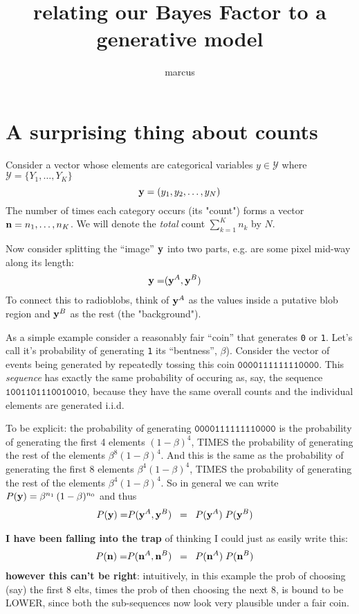 \documentclass[12pt]{article}
\title{relating our Bayes Factor to a generative model}
\author{marcus}
\date{}
\begin{document}
\maketitle

\section{A surprising thing about counts}

Consider a vector whose elements are categorical variables $y \in \mathcal{Y} $ where $\mathcal{Y} = \{Y_1,\ldots,Y_K \}$
\[
\mathbf{y} = (y_1,y_2, \ldots, y_N) \]
The number of times each category occurs (its "count") forms a vector
$ \mathbf{n} = n_1,\ldots,n_K  $. We will denote the {\it total} count $\sum_{k=1}^K n_k$ by $N$.

Now consider splitting the ``image'' $\mathbf{y}$ into two parts, e.g. are some pixel mid-way along its length:
\begin{align*}
\mathbf{y} =& (\mathbf{y}^A, \mathbf{y}^B)
\end{align*}
To connect this to radioblobs, think of $\mathbf{y}^A$ as the values inside a putative blob region and $\mathbf{y}^B$ as the rest (the "background").

As a simple example consider a reasonably fair ``coin'' that
generates \texttt{0} or \texttt{1}. Let's call it's probability of
generating \texttt{1} its ``bentness'', $\beta$).  Consider the vector
of events being generated by repeatedly tossing this coin
$\mathtt{0000111111110000}$.  This {\it sequence} has exactly the same
probability of occuring as, say, the sequence
$\mathtt{1001101110010010}$, because they have the same overall counts
and the individual elements are generated i.i.d.

To be explicit: the probability of generating
$\mathtt{0000111111110000}$ is the probability of generating the first
4 elements $(1-\beta)^4$, TIMES the probability of generating the rest
of the elements $\beta^8 (1-\beta)^4$. And this is the same as the
probability of generating the first 8 elements $\beta^4(1-\beta)^4$,
TIMES the probability of generating the rest of the elements $\beta^4
(1-\beta)^4$. So in general we can write $P(\mathbf{y}) = \beta^{n_1} \, (1-\beta)^{n_0}$ and  thus
\begin{align*}
P(\mathbf{y}) =& P(\mathbf{y}^A , \mathbf{y}^B)
\;\; = \;\; P(\mathbf{y}^A) \; P(\mathbf{y}^B)
\end{align*}

{\bf I have been falling into the trap} of thinking I could just as easily write this:
\begin{align*}
P(\mathbf{n}) =& P(\mathbf{n}^A , \mathbf{n}^B)
\;\; =\;\; P(\mathbf{n}^A) \; P(\mathbf{n}^B)
\end{align*} {\bf however this can't be right}: intuitively, in this
example the prob of choosing (say) the first 8 elts, times the prob of
then choosing the next 8, is bound to be LOWER, since both the
sub-sequences now look very plausible under a fair coin.
\end{document}
